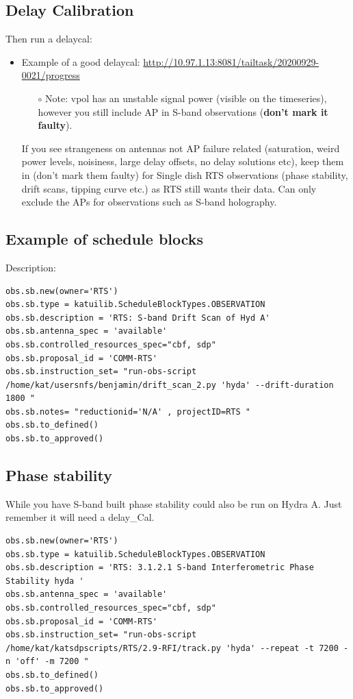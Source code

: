 \subsection{ Delay Calibration}
Then run a delaycal:
\begin{itemize}
 \item Example of a good delaycal: \url{http://10.97.1.13:8081/tailtask/20200929-0021/progress }
 \begin{itemize}
\item[$\circ$] Note:  vpol has an unstable signal power (visible on the timeseries), however you still include AP in S-band observations (\textbf{don’t mark it faulty}).
\end{itemize}
If you see strangeness on antennas not AP failure related (saturation, weird power levels, noisiness, large delay offsets, no delay solutions etc), keep them in (don’t mark them faulty) for Single dish RTS observations (phase stability, drift scans, tipping curve etc.) as RTS still wants their data. Can only exclude the APs for observations such as S-band holography.
\end{itemize}
\subsection{ Example of schedule blocks}
Description:
\begin{lstlisting}[style=DOS]
obs.sb.new(owner='RTS')
obs.sb.type = katuilib.ScheduleBlockTypes.OBSERVATION
obs.sb.description = 'RTS: S-band Drift Scan of Hyd A'
obs.sb.antenna_spec = 'available'
obs.sb.controlled_resources_spec="cbf, sdp"
obs.sb.proposal_id = 'COMM-RTS'
obs.sb.instruction_set= "run-obs-script /home/kat/usersnfs/benjamin/drift_scan_2.py 'hyda' --drift-duration 1800 "
obs.sb.notes= "reductionid='N/A' , projectID=RTS "
obs.sb.to_defined()
obs.sb.to_approved()
\end{lstlisting}


\subsection{ Phase stability} 
While you have S-band built phase stability could also be run on Hydra A.
Just remember it will need a delay\_Cal.
\begin{lstlisting}[style=DOS]
obs.sb.new(owner='RTS')
obs.sb.type = katuilib.ScheduleBlockTypes.OBSERVATION
obs.sb.description = 'RTS: 3.1.2.1 S-band Interferometric Phase Stability hyda '
obs.sb.antenna_spec = 'available'
obs.sb.controlled_resources_spec="cbf, sdp"
obs.sb.proposal_id = 'COMM-RTS'
obs.sb.instruction_set= "run-obs-script /home/kat/katsdpscripts/RTS/2.9-RFI/track.py 'hyda' --repeat -t 7200 -n 'off' -m 7200 "
obs.sb.to_defined()
obs.sb.to_approved()

\end{lstlisting}

